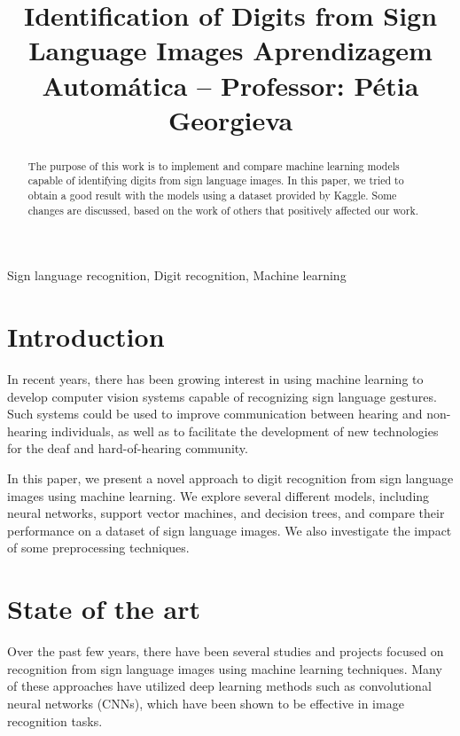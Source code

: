\documentclass[conference]{IEEEtran}
\begin{document}
\title{Identification of Digits from Sign Language Images
{\small Aprendizagem Automática -- Professor: Pétia Georgieva}
}

\author{
\and
{}
}

\maketitle

\begin{abstract}
    The purpose of this work is to implement and
    compare machine learning models capable of identifying digits from sign language images.
    In this paper, we tried to obtain a good result with the models using
    a dataset provided by Kaggle. Some changes are discussed,
    based on the work of others that positively affected our
    work.
\end{abstract}

\begin{IEEEkeywords}
Sign language recognition, Digit recognition, Machine learning
\end{IEEEkeywords}

\section{Introduction}
In recent years, there has been growing interest in using machine learning to develop computer vision systems capable of recognizing sign language gestures. Such systems could be used to improve communication between hearing and non-hearing individuals, as well as to facilitate the development of new technologies for the deaf and hard-of-hearing community.

In this paper, we present a novel approach to digit recognition from sign language images using machine learning. We explore several different models, including neural networks, support vector machines, and decision trees, and compare their performance on a dataset of sign language images. We also investigate the impact of some preprocessing techniques.

\section{State of the art}
Over the past few years, there have been several studies and projects focused on recognition from sign language images using machine learning techniques. Many of these approaches have utilized deep learning methods such as convolutional neural networks (CNNs), which have been shown to be effective in image recognition tasks.
\end{document}
